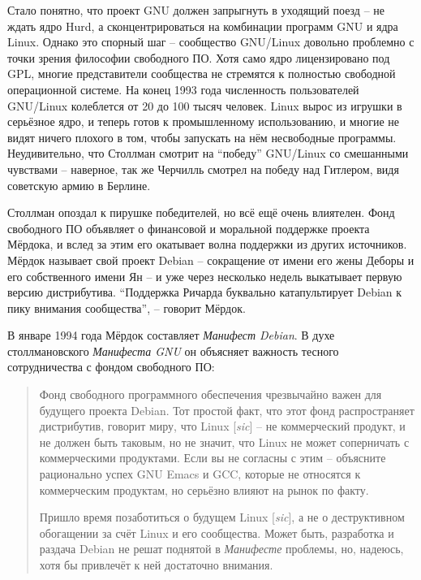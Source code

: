 Стало понятно, что проект GNU должен запрыгнуть в уходящий поезд -- не ждать ядро Hurd, а сконцентрироваться на комбинации программ GNU и ядра Linux. Однако это спорный шаг -- сообщество GNU/Linux довольно проблемно с точки зрения философии свободного ПО. Хотя само ядро лицензировано под GPL, многие представители сообщества не стремятся к полностью свободной операционной системе. На конец 1993 года численность пользователей GNU/Linux колеблется от 20 до 100 тысяч человек.  Linux вырос из игрушки в серьёзное ядро, и теперь готов к промышленному использованию, и многие не видят ничего плохого в том, чтобы запускать на нём несвободные программы. Неудивительно, что Столлман смотрит на \enquote{победу} GNU/Linux со смешанными чувствами -- наверное, так же Черчилль смотрел на победу над Гитлером, видя советскую армию в Берлине.

Столлман опоздал к пирушке победителей, но всё ещё очень влиятелен. Фонд свободного ПО объявляет о финансовой и моральной поддержке проекта Мёрдока, и вслед за этим его окатывает волна поддержки из других источников. Мёрдок называет свой проект Debian -- сокращение от имени его жены Деборы и его собственного имени Ян -- и уже через несколько недель выкатывает первую версию дистрибутива. \enquote{Поддержка Ричарда буквально катапультирует Debian к пику внимания сообщества}, -- говорит Мёрдок.

В январе 1994 года Мёрдок составляет \textit{Манифест Debian}. В духе столлмановского \textit{Манифеста GNU} он объясняет важность тесного сотрудничества с фондом свободного ПО:

\begin{quote}
Фонд свободного программного обеспечения чрезвычайно важен для будущего проекта Debian. Тот простой факт, что этот фонд распространяет дистрибутив, говорит миру, что Linux [\textit{sic}] -- не коммерческий продукт, и не должен быть таковым, но не значит, что Linux не может соперничать с коммерческими продуктами. Если вы не согласны с этим -- объясните рационально успех GNU Emacs и GCC, которые не относятся к коммерческим продуктам, но серьёзно влияют на рынок по факту.

Пришло время позаботиться о будущем Linux [\textit{sic}], а не о деструктивном обогащении за счёт Linux и его сообщества. Может быть, разработка и раздача Debian не решат поднятой в \textit{Манифесте} проблемы, но, надеюсь, хотя бы привлечёт к ней достаточно внимания.
\end{quote}

